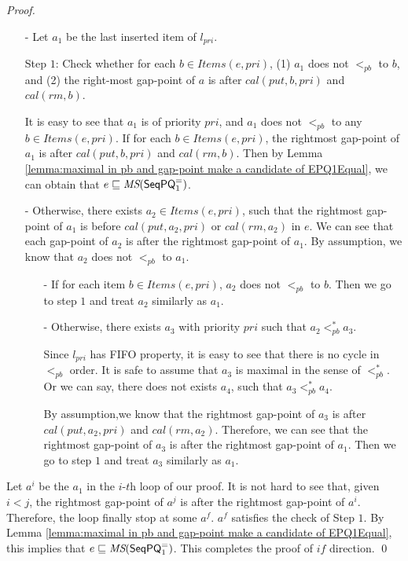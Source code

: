 \begin {proof}
\begin{itemize}
\item[-] Let $a_1$ be the last inserted item of $l_{\textit{pri}}$.

    Step $1$: Check whether for each $b \in \textit{Items}(e,\textit{pri})$, (1) $a_1$ does not $<_{\textit{pb}}$ to $b$, and (2) the right-most gap-point of $a$ is after $\textit{cal}(\textit{put},b,\textit{pri})$ and $\textit{cal}(\textit{rm},b)$.

    It is easy to see that $a_1$ is of priority $\textit{pri}$, and $a_1$ does not $<_{\textit{pb}}$ to any $b \in \textit{Items}(e,\textit{pri})$. If for each $b \in \textit{Items}(e,\textit{pri})$, the rightmost gap-point of $a_1$ is after $\textit{cal}(\textit{put},b,\textit{pri})$ and $\textit{cal}(\textit{rm},b)$. Then by Lemma \ref{lemma:maximal in pb and gap-point make a candidate of EPQ1Equal}, we can obtain that $e \sqsubseteq \textit{MS}(\mathsf{SeqPQ}_1^{=})$.


\item[-] Otherwise, there exists $a_2 \in \textit{Items}(e,\textit{pri})$, such that the rightmost gap-point of $a_1$ is before $\textit{cal}(\textit{put},a_2,\textit{pri})$ or $\textit{cal}(\textit{rm},a_2)$ in $e$. We can see that each gap-point of $a_2$ is after the rightmost gap-point of $a_1$.%
    By assumption, we know that $a_2$ does not $<_{\textit{pb}}$ to $a_1$.

    \begin{itemize}
    \setlength{\itemsep}{0.5pt}
    \item[-] If for each item $b \in \textit{Items}(e,\textit{pri})$, $a_2$ does not $<_{\textit{pb}}$ to $b$. Then we go to step $1$ and treat $a_2$ similarly as $a_1$.
    \item[-] Otherwise, there exists $a_3$ with priority $\textit{pri}$ such that $a_2 <_{\textit{pb}}^* a_3$.

    Since $l_{\textit{pri}}$ has FIFO property, it is easy to see that there is no cycle in $<_{\textit{pb}}$ order. It is safe to assume that $a_3$ is maximal in the sense of $<_{\textit{pb}}^*$. Or we can say, there does not exists $a_4$, such that $a_3 <_{\textit{pb}}^* a_4$.

    By assumption,we know that the rightmost gap-point of $a_3$ is after $\textit{cal}(\textit{put},a_2,\textit{pri})$ and $\textit{cal}(\textit{rm},a_2)$. Therefore, we can see that the rightmost gap-point of $a_3$ is after the rightmost gap-point of $a_1$. Then we go to step $1$ and treat $a_3$ similarly as $a_1$.
    \end{itemize}
\end{itemize}

Let $a^i$ be the $a_1$ in the $\textit{i-th}$ loop of our proof. It is not hard to see that, given $i<j$, the rightmost gap-point of $a^j$ is after the rightmost gap-point of $a^i$. Therefore, the loop finally stop at some $a^f$. $a^f$ satisfies the check of Step $1$. By Lemma \ref{lemma:maximal in pb and gap-point make a candidate of EPQ1Equal}, this implies that $e \sqsubseteq \textit{MS}(\mathsf{SeqPQ}_1^{=})$. This completes the proof of $\textit{if}$ direction. \qed
\end {proof}
